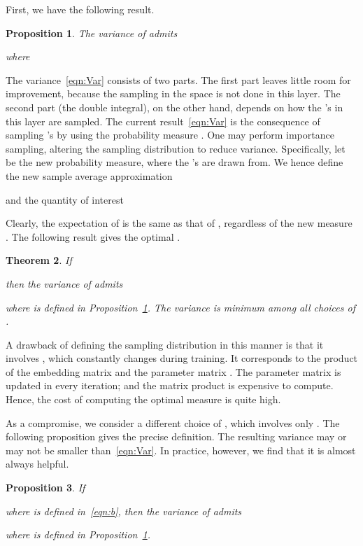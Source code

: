 \documentclass{article} \usepackage{iclr2018_conference,times}
\theoremstyle{plain}\newtheorem{theorem}{Theorem}\theoremstyle{plain}\newtheorem{proposition}[theorem]{Proposition}
\theoremstyle{plain}\newtheorem{corollary}[theorem]{Corollary}
\theoremstyle{plain}\newtheorem{lemma}[theorem]{Lemma}
\begin{document}
First, we have the following result.

\begin{proposition}\label{thm:E.Var}
The variance of  admits

where

\end{proposition}

The variance~\eqref{eqn:Var} consists of two parts. The first part  leaves little room for improvement, because the sampling in the  space is not done in this layer. The second part (the double integral), on the other hand, depends on how the 's in this layer are sampled. The current result~\eqref{eqn:Var} is the consequence of sampling 's by using the probability measure . One may perform importance sampling, altering the sampling distribution to reduce variance. Specifically, let  be the new probability measure, where the 's are drawn from.
We hence define the new sample average approximation

and the quantity of interest

Clearly, the expectation of  is the same as that of , regardless of the new measure . The following result gives the optimal .

\begin{theorem}\label{thm:E.Var2}
If

then the variance of  admits

where  is defined in Proposition~\ref{thm:E.Var}. The variance is minimum among all choices of .
\end{theorem}

A drawback of defining the sampling distribution  in this manner is that it involves , which constantly changes during training. It corresponds to the product of the embedding matrix  and the parameter matrix . The parameter matrix is updated in every iteration; and the matrix product is expensive to compute. Hence, the cost of computing the optimal measure  is quite high.

As a compromise, we consider a different choice of , which involves only . The following proposition gives the precise definition. The resulting variance may or may not be smaller than~\eqref{eqn:Var}. In practice, however, we find that it is almost always helpful.

\begin{proposition}\label{thm:E.Var3}
If

where  is defined in~\eqref{eqn:b}, then the variance of  admits

where  is defined in Proposition~\ref{thm:E.Var}.
\end{proposition}
\end{document}

